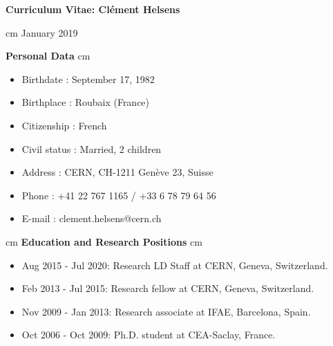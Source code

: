 \documentclass[12pt]{article}
\begin{document}
\pagestyle{plain}
\fancyhf{}


\begin{center}
\vskip 1cm
{\bf \Large Curriculum Vitae: Cl\'ement Helsens} \\
\end{center}
\vskip 0.5cm
 cm January 2019
\vskip 1.8cm

{\bf \large Personal Data}
 cm
\TabPositions{2.5cm}
\begin{itemize}
\itemsep0em
\item[] Birthdate  \tab : September 17, 1982
\item[] Birthplace \tab :   Roubaix (France) 
\item[] Citizenship \tab :  French
\item[] Civil status \tab : Married, 2 children
\item[] Address \tab : CERN, CH-1211 Gen\`eve 23, Suisse
\item[] Phone \tab : +41 22 767 1165  / +33 6 78 79 64 56
\item[] E-mail \tab : clement.helsens@cern.ch
\end{itemize}


 cm
{\bf \large Education and Research Positions}
 cm
\TabPositions{2.5cm}
\begin{itemize}
\itemsep0em
\item[] Aug 2015 - Jul 2020: Research LD Staff at CERN, Geneva, Switzerland.
\item[] Feb 2013 - Jul 2015: Research fellow at CERN, Geneva, Switzerland.
\item[] Nov 2009 - Jan 2013: Research associate at IFAE, Barcelona, Spain.
\item[] Oct 2006 - Oct 2009: Ph.D. student at CEA-Saclay, France.
\end{itemize}
\end{document}
